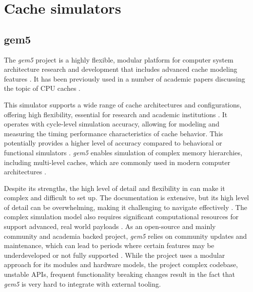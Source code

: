 \section{Cache simulators}

\subsection{gem5}

The \textit{gem5} project is a highly flexible, modular platform for computer system architecture research and development that includes advanced cache modeling features \cite{gem5cachesupport}.
It has been previously used in a number of academic papers discussing the topic of CPU caches \cite{gem5cachecite1, gem5cachecite2, gem5cachecite3}.

This simulator supports a wide range of cache architectures and configurations, offering high flexibility, essential for research and academic institutions \cite{gem5}.
It operates with cycle-level simulation accuracy, allowing for modeling and measuring the timing performance characteristics of cache behavior. This potentially provides a higher level of accuracy
compared to behavioral or functional simulators \cite{gem5accuracy}. \textit{gem5} enables simulation of complex memory hierarchies, including multi-level caches, which are commonly
used in modern computer architectures \cite{gem5multilevel, cachesimsurv}.

Despite its strengths, the high level of detail and flexibility in 
can make it complex and difficult to set up. The documentation is extensive, but its high level of detail can be overwhelming,
making it challenging to navigate effectively \cite{gem5hell}. The complex simulation model also requires significant computational resources for support advanced, real world payloads
\cite{gem5, cachesimsurv}. As an open-source and mainly community and academia backed project, \textit{gem5} relies on community updates and maintenance, which can lead to periods where certain
features may be underdeveloped or not fully supported \cite{gem5hell, gem5maintainers}.
While the project uses a modular approach for its modules and hardware models, the project complex codebase,
unstable APIs, frequent functionality breaking changes \cite{gem5hell} result in the fact that \textit{gem5} is very hard to integrate with external tooling.

